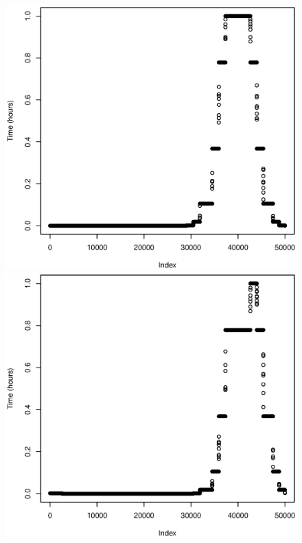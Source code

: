 \documentclass[a4paper, twocolumn]{article}
\begin{document}
\begin{figure}[!ht]
\begin{minipage}[]{0.2\textwidth}
	    \end{minipage}
	    \begin{minipage}[]{0.2\textwidth}
	    	\includegraphics[width=\textwidth]{share/3_time.eps}
	    \end{minipage}
	    \begin{minipage}[]{0.2\textwidth}
	    	\includegraphics[width=\textwidth]{share/4_time.eps}

\end{minipage}
\end{figure}
\end{document}
